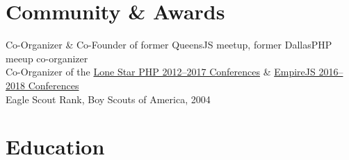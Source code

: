 \documentclass{resume}
\begin{document}
\section{Community \& Awards}

Co-Organizer \& Co-Founder of former QueensJS meetup, former DallasPHP meeup co-organizer
\\
Co-Organizer of the \href{http://lonestarphp.com/}{Lone Star PHP 2012--2017 Conferences} \& \href{http://empirejs.org/}{EmpireJS 2016--2018 Conferences}
\\
Eagle Scout Rank, Boy Scouts of America, 2004

\section{Education}

\end{document}
